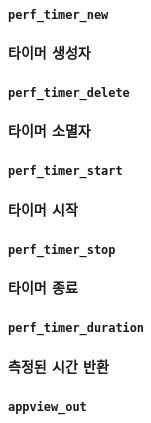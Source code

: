 \documentclass[UTF8, a4paper]{report}
\begin{document}
            \paragraph{\texttt{perf\_timer\_new}}
            \paragraph{%
                \normalfont 타이머 생성자
            }

            \paragraph{\texttt{perf\_timer\_delete}}
            \paragraph{%
                \normalfont 타이머 소멸자
            }

            \paragraph{\texttt{perf\_timer\_start}}
            \paragraph{%
                \normalfont 타이머 시작
            }

            \paragraph{\texttt{perf\_timer\_stop}}
            \paragraph{%
                \normalfont 타이머 종료
            }

            \paragraph{\texttt{perf\_timer\_duration}}
            \paragraph{%
                \normalfont 측정된 시간 반환
            }

            \paragraph{\texttt{appview\_out}}
\end{document}
